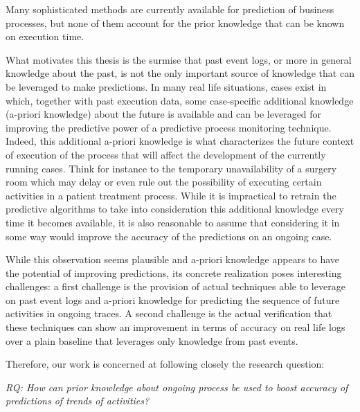 Many sophisticated methods\cite{evermann,Polatoetal:2016,niek96732} are currently available for prediction of business processes, but none of them account for the prior knowledge that can be known on execution time. 

What motivates this thesis is the surmise that past event logs, or more in general knowledge about the past, is not the only important source of knowledge that can be leveraged to make predictions. In many real life situations, cases exist in which, together with past execution data, some case-specific additional knowledge (a-priori knowledge) about the future is available and can be leveraged for improving the predictive power of a predictive process monitoring technique. Indeed, this additional a-priori knowledge is what characterizes the future context of execution of the process that will affect the development of the currently running cases. Think for instance to the temporary unavailability of a surgery room which may delay or even rule out the possibility of executing  certain activities in a patient treatment process. While it is impractical to retrain the predictive algorithms to take into consideration this additional knowledge every time it becomes available, it is also reasonable to assume that considering it in some way would improve the accuracy of the predictions on an ongoing case.

While this observation seems plausible and a-priori knowledge appears to have the potential of improving predictions, its concrete realization poses interesting challenges: a first challenge is the provision of actual techniques able to leverage on past event logs and a-priori knowledge for predicting the sequence of future activities in ongoing traces. A second challenge is the actual verification that these techniques can show an improvement in terms of accuracy on real life logs over a plain baseline that leverages only knowledge from past events.

Therefore, our work is concerned at following closely the research question:

\textit{RQ: How can prior knowledge about ongoing process be used to boost accuracy of predictions of trends of activities?}


